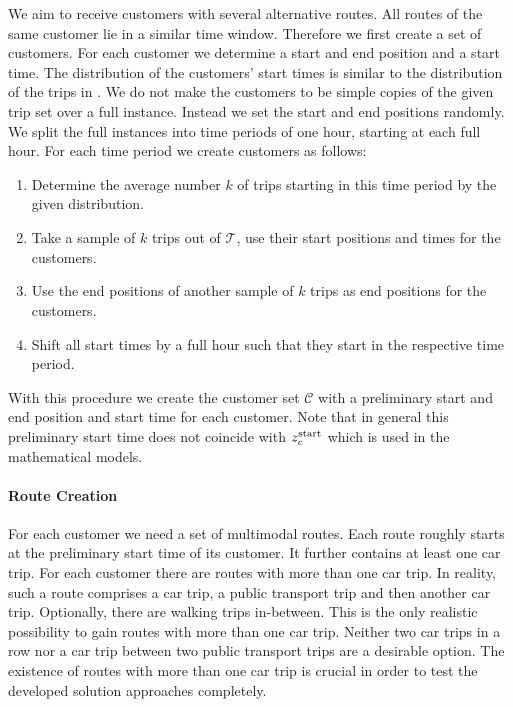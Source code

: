 We aim to receive customers with several alternative routes. All routes of the same customer lie in a similar time window. Therefore we first create a set of customers. For each customer we determine a start and end position and a start time. The distribution of the customers' start times is similar to the distribution of the trips in . We do not make the customers to be simple copies of the given trip set over a full instance. Instead we set the start and end positions randomly. We split the full instances into time periods of one hour, starting at each full hour. For each time period we create customers as follows:
\begin{enumerate}
	\item Determine the average number $k$ of trips starting in this time period by the given distribution.
	\item Take a sample of $k$ trips out of $\widehat{\mathcal{T}}$, use their start positions and times for the customers.
	\item Use the end positions of another sample of $k$ trips as end positions for the customers.
	\item Shift all start times by a full hour such that they start in the respective time period.
\end{enumerate}

With this procedure we create the customer set $\mathcal{C}$ with a preliminary start and end position and start time for each customer. Note that in general this preliminary start time does not coincide with $z^{\operatorname{start}}_c$ which is used in the mathematical models.

\paragraph{Route Creation} \parfill

For each customer we need a set of multimodal routes. Each route roughly starts at the preliminary start time of its customer. It further contains at least one car trip. For each customer there are routes with more than one car trip. In reality, such a route comprises a car trip, a public transport trip and then another car trip. Optionally, there are walking trips in-between. This is the only realistic possibility to gain routes with more than one car trip. Neither two car trips in a row nor a car trip between two public transport trips are a desirable option. The existence of routes with more than one car trip is crucial in order to test the developed solution approaches completely.

